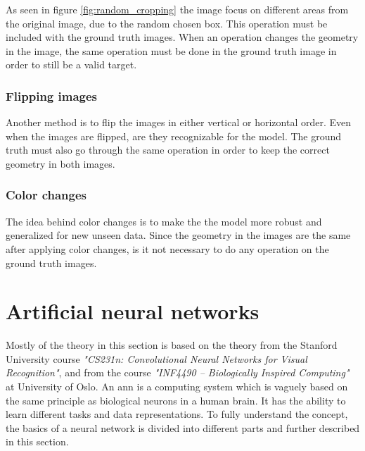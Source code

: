 \documentclass[USenglish]{ifimaster}  %
\begin{document}
As seen in figure \cref{fig:random_cropping} the image focus on different areas from the original image, due to the random chosen box. This operation must be included with the ground truth images. When an operation changes the geometry in the image, the same operation must be done in the ground truth image in order to still be a valid target. 
\subsubsection{Flipping images}
Another method is to flip the images in either vertical or horizontal order. Even when the images are flipped, are they recognizable for the model. The ground truth must also go through the same operation in order to keep the correct geometry in both images. 
\subsubsection{Color changes}
The idea behind color changes is to make the the model more robust and generalized for new unseen data. Since the geometry in the images are the same after applying color changes, is it not necessary to do any operation on the ground truth images.
\section{Artificial neural networks}
Mostly of the theory in this section is based on the theory from the Stanford University course \textit{"CS231n: Convolutional Neural Networks for Visual Recognition"}\cite{website:cs231n}, and from the course \textit{"INF4490 – Biologically Inspired Computing"}\cite{website:inf_4490_slp}\cite{website:inf_4490_mlp} at University of Oslo.
\newline
\newline
An \ac{ann} is a computing system which is vaguely based on the same principle as biological neurons in a human brain. It has the ability to learn different tasks and data representations. To fully understand the concept, the basics of a neural network is divided into different parts and further described in this section.
\newline
\newline
\end{document}
